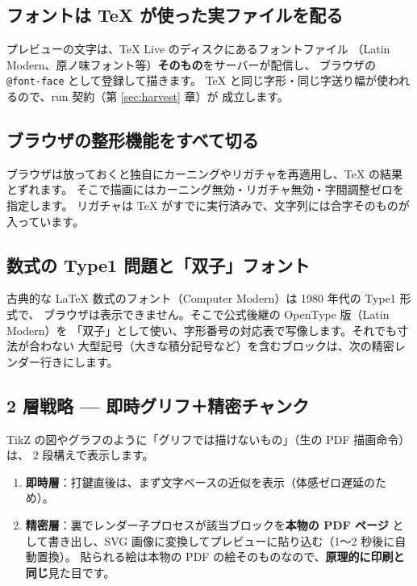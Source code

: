 \documentclass[11pt,a4paper]{ltjsarticle}
\newcommand{\code}[1]{\texttt{#1}}
\begin{document}
\subsection{フォントは TeX が使った実ファイルを配る}

プレビューの文字は、TeX Live のディスクにあるフォントファイル
（Latin Modern、原ノ味フォント等）\textbf{そのもの}をサーバーが配信し、
ブラウザの \code{@font-face} として登録して描きます。
TeX と同じ字形・同じ字送り幅が使われるので、run 契約（第 \ref{sec:harvest} 章）が
成立します。

\subsection{ブラウザの整形機能をすべて切る}

ブラウザは放っておくと独自にカーニングやリガチャを再適用し、TeX の結果とずれます。
そこで描画にはカーニング無効・リガチャ無効・字間調整ゼロを指定します。
リガチャは TeX がすでに実行済みで、文字列には合字そのものが入っています。

\subsection{数式の Type1 問題と「双子」フォント}

古典的な LaTeX 数式のフォント（Computer Modern）は 1980 年代の Type1 形式で、
ブラウザは表示できません。そこで公式後継の OpenType 版（Latin Modern）を
「双子」として使い、字形番号の対応表で写像します。それでも寸法が合わない
大型記号（大きな積分記号など）を含むブロックは、次の精密レンダー行きにします。

\subsection{2 層戦略 --- 即時グリフ＋精密チャンク}

TikZ の図やグラフのように「グリフでは描けないもの」（生の PDF 描画命令）は、
2 段構えで表示します。

\begin{enumerate}
\item \textbf{即時層}：打鍵直後は、まず文字ベースの近似を表示（体感ゼロ遅延のため）。
\item \textbf{精密層}：裏でレンダー子プロセスが該当ブロックを\textbf{本物の PDF ページ}
  として書き出し、SVG 画像に変換してプレビューに貼り込む（1〜2 秒後に自動置換）。
  貼られる絵は本物の PDF の絵そのものなので、\textbf{原理的に印刷と同じ}見た目です。
\end{enumerate}
\end{document}
